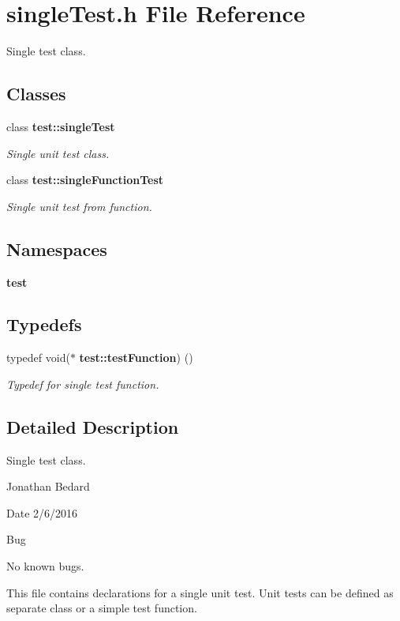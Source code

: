 \section{single\+Test.\+h File Reference}
\label{singleTest_8h}


Single test class.  


\subsection*{Classes}
\begin{DoxyCompactItemize}
\item 
class {\bf test\+::single\+Test}
\begin{DoxyCompactList}\small\item\em Single unit test class. \end{DoxyCompactList}\item 
class {\bf test\+::single\+Function\+Test}
\begin{DoxyCompactList}\small\item\em Single unit test from function. \end{DoxyCompactList}\end{DoxyCompactItemize}
\subsection*{Namespaces}
\begin{DoxyCompactItemize}
\item 
 {\bf test}
\end{DoxyCompactItemize}
\subsection*{Typedefs}
\begin{DoxyCompactItemize}
\item 
typedef void($\ast$ {\bf test\+::test\+Function}) ()
\begin{DoxyCompactList}\small\item\em Typedef for single test function. \end{DoxyCompactList}\end{DoxyCompactItemize}


\subsection{Detailed Description}
Single test class. 

Jonathan Bedard \begin{DoxyDate}{Date}
2/6/2016 
\end{DoxyDate}
\begin{DoxyRefDesc}{Bug}
\item[{\bf Bug}]No known bugs.\end{DoxyRefDesc}


This file contains declarations for a single unit test. Unit tests can be defined as separate class or a simple test function. 
